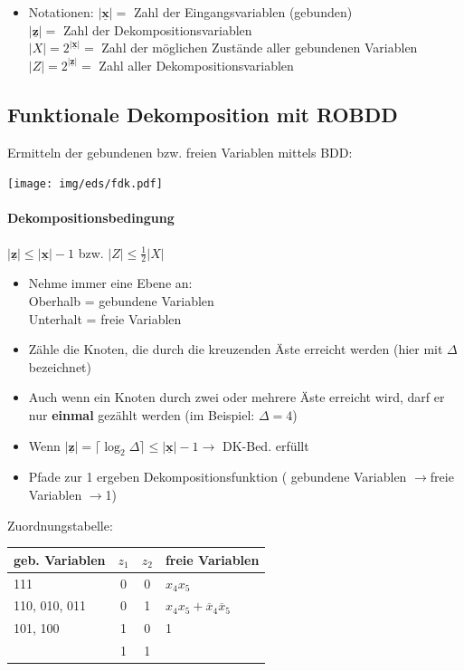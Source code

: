 \documentclass[6pt,a4paper]{scrartcl}
\renewcommand{\emph}[1]{\textsf{\textbf{#1}}}
\renewcommand{\vec}[1]{\ensuremath{\underline{\boldsymbol {#1}}}}
\newcommand{\abs}[1]{\ensuremath{\left\vert#1\right\vert}} 							%
\newcommand{\ol}[1]{\ensuremath{\overline{#1}}}									%
\newcommand{\ra}[0]{\ensuremath{\rightarrow}} 									%
\renewcommand{\vec}[1]{\ensuremath{\underline{\boldsymbol {#1}}}}
\begin{document}
\begin{multicols}{3}
\begin{itemize}
	\item Notationen:
		$\abs{\vec x} = $ Zahl der Eingangsvariablen (gebunden) \\
		$\abs{\vec z} = $ Zahl der Dekompositionsvariablen \\
		$\abs{X} = 2^{\abs{\vec x}} =$ Zahl der möglichen Zustände aller gebundenen Variablen \\
		$\abs{Z} = 2^{\abs{\vec z}} = $ Zahl aller Dekompositionsvariablen
\end{itemize}

\subsection{Funktionale Dekomposition mit ROBDD}
Ermitteln der gebundenen bzw. freien Variablen mittels BDD: \\
\parbox{2.7cm}{ \texttt{[image: img/eds/fdk.pdf]} }
\paragraph{Dekompositionsbedingung} %
$\abs{\vec z} \le \abs{\vec x} - 1$ bzw. $\abs{Z} \le \frac{1}{2} \abs{X}$ \\
\begin{itemize}
	\item Nehme immer eine Ebene an:\\
	Oberhalb = gebundene Variablen \\ 
	Unterhalt = freie Variablen
	\item Zähle die Knoten, die durch die kreuzenden Äste erreicht werden (hier mit $\Delta$ bezeichnet)
	\item Auch wenn ein Knoten durch zwei oder mehrere Äste erreicht wird, darf er nur \emph{einmal} gezählt werden (im Beispiel: $\Delta = 4$)
	\item Wenn $\abs{\vec z} = \lceil \log_2 \Delta \rceil \le \abs{\vec{x}} - 1 \ra$ DK-Bed. erfüllt
	\item Pfade zur 1 ergeben Dekompositionsfunktion ( gebundene Variablen \ra freie Variablen \ra 1)
\end{itemize}
Zuordnungstabelle:\\
\begin{tabular}{l|cc|l}
geb. Variablen & $z_1$ & $z_2$ & freie Variablen \\ \midrule
111 & 0 & 0 & $x_4 x_5$ \\
110, 010, 011 & 0 & 1 & $x_4 x_5 + \ol x_4 \ol x_5$ \\
101, 100 & 1 & 0 & 1 \\
& 1&1& \\
\end{tabular}


\end{multicols}
\end{document}
